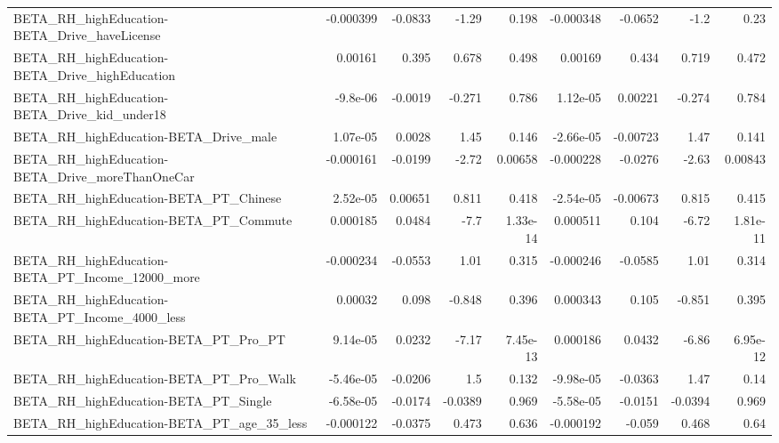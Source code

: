 \begin{tabular}{lrrrrrrrr}
BETA\_RH\_highEducation-BETA\_Drive\_haveLicense       &   -0.000399 &      -0.0833 &     -1.29 &    0.198 &  -0.000348 &     -0.0652 &         -1.2 &          0.23 \\
BETA\_RH\_highEducation-BETA\_Drive\_highEducation     &     0.00161 &        0.395 &     0.678 &    0.498 &    0.00169 &       0.434 &        0.719 &         0.472 \\
BETA\_RH\_highEducation-BETA\_Drive\_kid\_under18       &    -9.8e-06 &      -0.0019 &    -0.271 &    0.786 &   1.12e-05 &     0.00221 &       -0.274 &         0.784 \\
BETA\_RH\_highEducation-BETA\_Drive\_male              &    1.07e-05 &       0.0028 &      1.45 &    0.146 &  -2.66e-05 &    -0.00723 &         1.47 &         0.141 \\
BETA\_RH\_highEducation-BETA\_Drive\_moreThanOneCar    &   -0.000161 &      -0.0199 &     -2.72 &  0.00658 &  -0.000228 &     -0.0276 &        -2.63 &       0.00843 \\
BETA\_RH\_highEducation-BETA\_PT\_Chinese              &    2.52e-05 &      0.00651 &     0.811 &    0.418 &  -2.54e-05 &    -0.00673 &        0.815 &         0.415 \\
BETA\_RH\_highEducation-BETA\_PT\_Commute              &    0.000185 &       0.0484 &      -7.7 & 1.33e-14 &   0.000511 &       0.104 &        -6.72 &      1.81e-11 \\
BETA\_RH\_highEducation-BETA\_PT\_Income\_12000\_more    &   -0.000234 &      -0.0553 &      1.01 &    0.315 &  -0.000246 &     -0.0585 &         1.01 &         0.314 \\
BETA\_RH\_highEducation-BETA\_PT\_Income\_4000\_less     &     0.00032 &        0.098 &    -0.848 &    0.396 &   0.000343 &       0.105 &       -0.851 &         0.395 \\
BETA\_RH\_highEducation-BETA\_PT\_Pro\_PT               &    9.14e-05 &       0.0232 &     -7.17 & 7.45e-13 &   0.000186 &      0.0432 &        -6.86 &      6.95e-12 \\
BETA\_RH\_highEducation-BETA\_PT\_Pro\_Walk             &   -5.46e-05 &      -0.0206 &       1.5 &    0.132 &  -9.98e-05 &     -0.0363 &         1.47 &          0.14 \\
BETA\_RH\_highEducation-BETA\_PT\_Single               &   -6.58e-05 &      -0.0174 &   -0.0389 &    0.969 &  -5.58e-05 &     -0.0151 &      -0.0394 &         0.969 \\
BETA\_RH\_highEducation-BETA\_PT\_age\_35\_less          &   -0.000122 &      -0.0375 &     0.473 &    0.636 &  -0.000192 &      -0.059 &        0.468 &          0.64 \\

\end{tabular}
